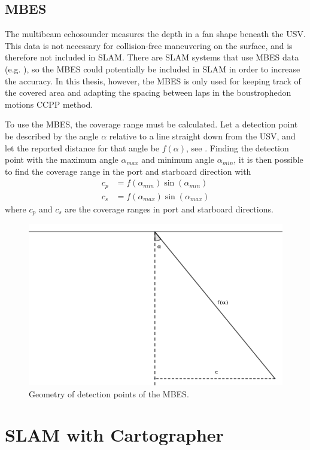 
\subsection{MBES}

The multibeam echosounder measures the depth in a fan shape beneath the USV. This data is not necessary for collision-free maneuvering on the surface, and is therefore not included in SLAM. There are SLAM systems that use MBES data (e.g. \citet{norgren2018multibeam}), so the MBES could potentially be included in SLAM in order to increase the accuracy. In this thesis, however, the MBES is only used for keeping track of the covered area and adapting the spacing between laps in the boustrophedon motions CCPP method. 

To use the MBES, the coverage range must be calculated. Let a detection point be described by the angle $\alpha$ relative to a line straight down from the USV, and let the reported distance for that angle be $f(\alpha)$, see . Finding the detection point with the maximum angle $\alpha_{max}$ and minimum angle $\alpha_{min}$, it is then possible to find the coverage range in the port and starboard direction with
\begin{align}
c_p &= f(\alpha_{min}) \sin(\alpha_{min}) \\
c_s &= f(\alpha_{max}) \sin(\alpha_{max})
\end{align}
where $c_p$ and $c_s$ are the coverage ranges in port and starboard directions.

\begin{figure}[h!]
	\centering
	\includegraphics[width=0.5\linewidth]{fig/instrumentation/mbes_range2}
	\caption{Geometry of detection points of the MBES.}
	\label{fig:mbes_range}
\end{figure}

\section{SLAM with Cartographer}

